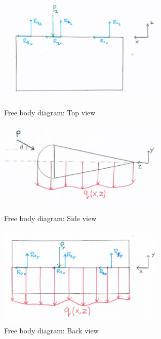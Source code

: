 \begin{figure}[H]
\begin{minipage}[b]{0.45\linewidth}
\centering
\includegraphics[width=8cm]{Images/FBD_top_view.JPG}
\caption{Free body diagram: Top view}
\label{fig:FBD_top_view}
\end{minipage}
\hspace{0.5cm}
\begin{minipage}[b]{0.45\linewidth}
\centering
\includegraphics[width=8cm]{Images/FBD_side_view.JPG}
\caption{Free body diagram: Side view}
\label{fig:FBD_side_view}
\end{minipage}
\begin{minipage}[b]{\linewidth}
\centering
\includegraphics[width=8cm]{Images/FBD_back_view.JPG}
\caption{Free body diagram: Back view}
\label{fig:FBD_back_view}
\end{minipage}
\end{figure}
